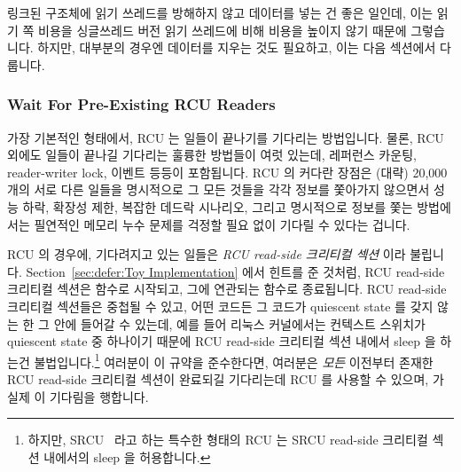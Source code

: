 링크된 구조체에 읽기 쓰레드를 방해하지 않고 데이터를 넣는 건 좋은 일인데, 이는
읽기 쪽 비용을 싱글쓰레드 버전 읽기 쓰레드에 비해 비용을 높이지 않기 때문에
그렇습니다.
하지만, 대부분의 경우엔 데이터를 지우는 것도 필요하고, 이는 다음 섹션에서
다룹니다.

\subsubsection{Wait For Pre-Existing RCU Readers}
\label{sec:defer:Wait For Pre-Existing RCU Readers}

가장 기본적인 형태에서, RCU 는 일들이 끝나기를 기다리는 방법입니다.
물론, RCU 외에도 일들이 끝나길 기다리는 훌륭한 방법들이 여럿 있는데, 레퍼런스
카운팅, reader-writer lock, 이벤트 등등이 포함됩니다.
RCU 의 커다란 장점은 (대략) 20,000 개의 서로 다른 일들을 명시적으로 그 모든
것들을 각각 정보를 쫓아가지 않으면서 성능 하락, 확장성 제한, 복잡한 데드락
시나리오, 그리고 명시적으로 정보를 쫓는 방법에서는 필연적인 메모리 누수 문제를
걱정할 필요 없이 기다릴 수 있다는 겁니다.

RCU 의 경우에, 기다려지고 있는 일들은 \emph{RCU read-side 크리티컬 섹션} 이라
불립니다.
Section~\ref{sec:defer:Toy Implementation}
에서 힌트를 준 것처럼, RCU read-side 크리티컬 섹션은 
함수로 시작되고, 그에 연관되는  함수로 종료됩니다.
RCU read-side 크리티컬 섹션들은 중첩될 수 있고, 어떤 코드든 그 코드가
quiescent state 를 갖지 않는 한 그 안에 들어갈 수 있는데, 예를 들어 리눅스
커널에서는 컨텍스트 스위치가 quiescent state 중 하나이기 때문에 RCU read-side
크리티컬 섹션 내에서 sleep 을 하는건 불법입니다.\footnote{
	하지만, SRCU~\cite{PaulEMcKenney2006c} 라고 하는 특수한 형태의 RCU 는
	SRCU read-side 크리티컬 섹션 내에서의 sleep 을 허용합니다.}
여러분이 이 규약을 준수한다면, 여러분은 \emph{모든} 이전부터 존재한 RCU
read-side 크리티컬 섹션이 완료되길 기다리는데 RCU 를 사용할 수 있으며,
 가 실제 이 기다림을 행합니다.

